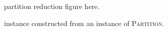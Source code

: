 \begin{figure}
	partition reduction figure here.
	\caption{\RL instance constructed from an instance of \textsc{Partition}.}
	\label{fig:partition-rl-instance}
\end{figure}